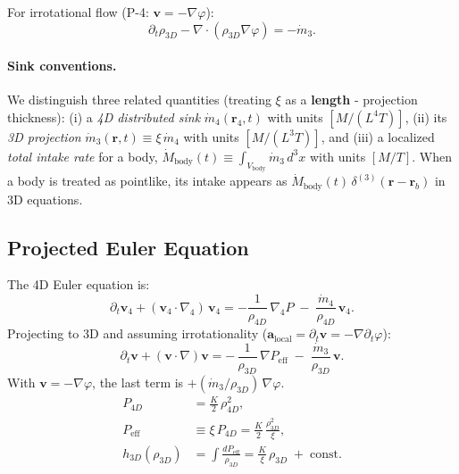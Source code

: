 For irrotational flow (P-4: $\mathbf{v} = -\nabla \varphi$):
\[
\partial_t \rho_{3D} - \nabla \cdot (\rho_{3D} \nabla \varphi) = -\dot{m}_{3}.
\]

\paragraph{Sink conventions.}
We distinguish three related quantities (treating $\xi$ as a \textbf{length} - projection thickness):
(i) a \emph{4D distributed sink} $\dot m_{4}(\mathbf r_4,t)$ with units $[M/(L^4 T)]$,
(ii) its \emph{3D projection} $\dot m_{3}(\mathbf r,t)\equiv \xi\,\dot m_{4}$ with units $[M/(L^3 T)]$,
and (iii) a localized \emph{total intake rate} for a body,
$\dot M_{\text{body}}(t)\equiv \int_{V_{\text{body}}}\dot m_{3}\,d^3x$ with units $[M/T]$.
When a body is treated as pointlike, its intake appears as
$\dot M_{\text{body}}(t)\,\delta^{(3)}(\mathbf r-\mathbf r_b)$ in 3D equations.

\subsection{Projected Euler Equation}

The 4D Euler equation is:
\begin{equation}
\partial_t \mathbf v_{4} + (\mathbf v_{4}\!\cdot\!\nabla_{4})\,\mathbf v_{4}
= -\frac{1}{\rho_{4D}}\,\nabla_{4}P \;-\; \frac{\dot m_{4}}{\rho_{4D}}\,\mathbf v_{4}.
\end{equation}
Projecting to 3D and assuming irrotationality ($\mathbf{a}_{\text{local}} = \partial_t \mathbf{v} = -\nabla \partial_t \varphi$):
\begin{equation}
\partial_t \mathbf v + (\mathbf v\!\cdot\!\nabla)\mathbf v
= -\,\frac{1}{\rho_{3D}}\,\nabla P_{\mathrm{eff}}
\;-\; \frac{\dot m_{3}}{\rho_{3D}}\,\mathbf v.
\end{equation}
With $\mathbf v=-\nabla\varphi$, the last term is $+(\dot m_3/\rho_{3D})\,\nabla\varphi$.
\begin{align}
P_{4D} &= \frac{K}{2}\,\rho_{4D}^{2}, \\[4pt]
P_{\mathrm{eff}} &\equiv \xi\,P_{4D}
= \frac{K}{2}\,\frac{\rho_{3D}^{2}}{\xi}, \\[4pt]
h_{3D}(\rho_{3D})
&= \int \frac{dP_{\mathrm{eff}}}{\rho_{3D}}
= \frac{K}{\xi}\,\rho_{3D} \;+\; \text{const.}
\end{align}

